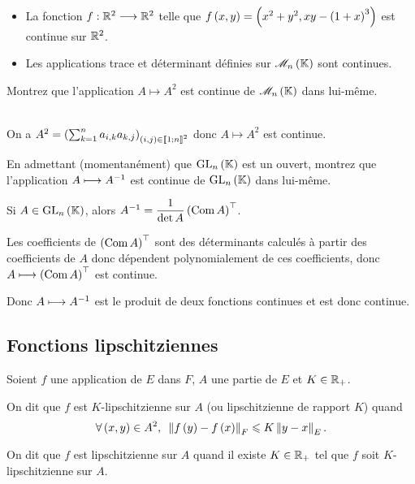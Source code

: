 \begin{ex}
\begin{itemize}
    \item La fonction \(f:\mathbb{R}^2\longrightarrow\mathbb{R}^2\) telle que \(f\left(x,y\right)=\left(x^2+y^2,xy-\left(1+x\right)^3\right)\) est continue sur \(\mathbb{R}^2\). \\
    \item Les applications trace et déterminant définies sur \(\M{n}\) sont continues.
\end{itemize}
\end{ex}

\begin{exo}
Montrez que l'application \(A\mapsto A^2\) est continue de \(\M{n}\) dans lui-même.
\end{exo}

\begin{corr}~\\
On a \(A^2=\left(\sum_{k=1}^na_{i,k}a_{k,j}\right)_{\left(i,j\right)\in\left\llbracket1;n\right\rrbracket^2}\) donc \(A\mapsto A^2\) est continue.
\end{corr}

\begin{exo}
En admettant (momentanément) que \(\GL{n}\) est un ouvert, montrez que l'application \(A\longmapsto A^{-1}\) est continue de \(\GL{n}\) dans lui-même.
\end{exo}

\begin{corr}
Si \(A\in\GL{n}\), alors \(A^{-1}=\dfrac{1}{\det A}\left(\operatorname{Com}A\right)^{\top}\).

Les coefficients de \(\left(\operatorname{Com}A\right)^{\top}\) sont des déterminants calculés à partir des coefficients de \(A\) donc dépendent polynomialement de ces coefficients, donc \(A\longmapsto\left(\operatorname{Com}A\right)^{\top}\) est continue.

Donc \(A\longmapsto A^{-1}\) est le produit de deux fonctions continues et est donc continue.
\end{corr}

\subsection{Fonctions lipschitziennes}

\begin{defi}
Soient \(f\) une application de \(E\) dans \(F\), \(A\) une partie de \(E\) et \(K\in\mathbb{R}_+\).

On dit que \(f\) est \(K\)-lipschitzienne sur \(A\) (ou lipschitzienne de rapport \(K\)) quand \[\quantifs{\forall\paren{x,y}\in A^2}\norme{f\paren{y}-f\paren{x}}_F\leq K\norme{y-x}_E.\]

On dit que \(f\) est lipschitzienne sur \(A\) quand il existe \(K\in\mathbb{R}_+\) tel que \(f\) soit \(K\)-lipschitzienne sur \(A\).
\end{defi}

